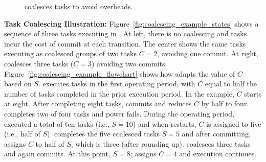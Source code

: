 \begin{figure}
	\centering
	\caption{\sys coalesces tasks to avoid overheads.}
	\label{fig:coalescing_example}
\end{figure}

\noindent\textbf{Task Coalescing Illustration:}
Figure~\ref{fig:coalescing_example_states} shows a sequence of three tasks
executing in \sys. At left, there is no coalescing and tasks incur the cost of
commit at each transition. The center shows the same tasks executing as
coalesced groups of two tasks $C=2$, avoiding one commit.  At right, \sys
coalesces three tasks ($C=3$) avoiding two commits.
Figure~\ref{fig:coalescing_example_flowchart} shows how \sys adapts the value
of $C$ based on $S$. \sys executes tasks in the first operating period, with
$C$ equal to half the number of tasks completed in the prior execution period.
In the example, $C$ starts at eight. After completing eight tasks, \sys commits
and reduces $C$ by half to four.  \sys completes two of four tasks and power
fails.  During the operating period, \sys executed a total of ten tasks (i.e.,
$S=10$) and when \sys restarts, $C$ is assigned to five (i.e., half of $S$).
\sys completes the five coalesced tasks $S=5$ and after committing, assigns $C$
to half of $S$, which is three (after rounding up). \sys coalesces three tasks
and again commits.  At this point, $S=8$; \sys assigns $C=4$ and execution
continues.


